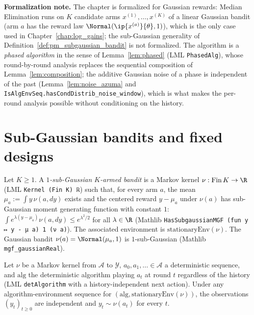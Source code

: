 \textbf{Formalization note.} The chapter is formalized for Gaussian rewards: Median Elimination
runs on $K$ candidate arms $x^{(1)},\dots,x^{(K)}$ of a linear Gaussian bandit (arm $a$ has the
reward law $\Normal(\ip{x^{(a)}}{\theta},1)$), which is the only case used in
Chapter~\ref{chap:log_gains}; the sub-Gaussian generality of
Definition~\ref{def:pm_subgaussian_bandit} is not formalized. The algorithm is a \emph{phased
algorithm} in the sense of Lemma~\ref{lem:phased} (LML \texttt{PhasedAlg}), whose round-by-round
analysis replaces the sequential composition of Lemma~\ref{lem:composition}; the additive
Gaussian noise of a phase is independent of the past (Lemma~\ref{lem:noise_azuma} and
\texttt{IsAlgEnvSeq.hasCondDistrib\_noise\_window}), which is what makes the per-round
analysis possible without conditioning on the history.

\section{Sub-Gaussian bandits and fixed designs}
\label{sec:pre_median_setting}

\begin{definition}\label{def:pm_subgaussian_bandit}
Let $K\ge1$. A \emph{$1$-sub-Gaussian $K$-armed bandit} is a Markov kernel
$\nu : \mathrm{Fin}\,K\to\R$ (LML \texttt{Kernel (Fin K) ℝ}) such that, for every arm $a$, the
mean $\mu_a := \int y\,\nu(a,dy)$ exists and the centered reward $y - \mu_a$ under $\nu(a)$ has
sub-Gaussian moment generating function with constant $1$: $\int e^{\lambda(y-\mu_a)}\nu(a,dy)\le e^{\lambda^2/2}$
for all $\lambda\in\R$ (Mathlib \texttt{HasSubgaussianMGF (fun y ↦ y - μ a) 1 (ν a)}). The
associated environment is $\mathrm{stationaryEnv}(\nu)$. The Gaussian bandit
$\nu(a) = \Normal(\mu_a,1)$ is $1$-sub-Gaussian (Mathlib \texttt{mgf\_gaussianReal}).
\end{definition}

\begin{lemma}\label{lem:pm_fixed_design_rewards}
\leanok
{}
Let $\nu$ be a Markov kernel from $\mathcal{A}$ to $\mathcal{Y}$, $a_0,a_1,\dots\in\mathcal{A}$ a
deterministic sequence, and $\mathrm{alg}$ the deterministic algorithm playing $a_t$ at round $t$
regardless of the history (LML \texttt{detAlgorithm} with a history-independent next action).
Under any algorithm-environment sequence for $(\mathrm{alg},\mathrm{stationaryEnv}(\nu))$, the
observations $(y_t)_{t\ge0}$ are independent and $y_t\sim\nu(a_t)$ for every $t$.
\end{lemma}

